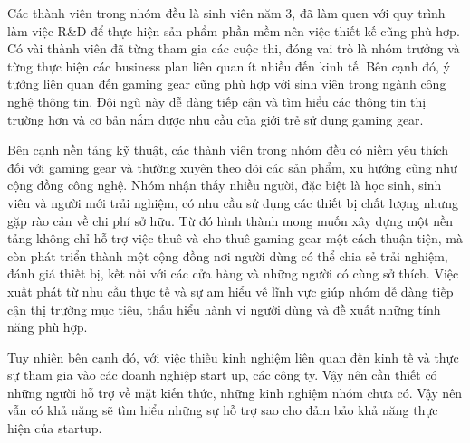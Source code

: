 Các thành viên trong nhóm đều là sinh viên năm 3, đã làm quen với quy trình làm việc R\&D để thực hiện sản phẩm phần mềm nên việc thiết kế cũng phù hợp. Có vài thành viên đã từng tham gia các cuộc thi, đóng vai trò là nhóm trưởng và từng thực hiện các business plan liên quan ít nhiều đến kinh tế. Bên cạnh đó, ý tưởng liên quan đến gaming gear cũng phù hợp với sinh viên trong ngành công nghệ thông tin. Đội ngũ này dễ dàng tiếp cận và tìm hiểu các thông tin thị trường hơn và cơ bản nắm được nhu cầu của giới trẻ sử dụng gaming gear.

Bên cạnh nền tảng kỹ thuật, các thành viên trong nhóm đều có niềm yêu thích đối với gaming gear và thường xuyên theo dõi các sản phẩm, xu hướng cũng như cộng đồng công nghệ. Nhóm nhận thấy nhiều người, đặc biệt là học sinh, sinh viên và người mới trải nghiệm, có nhu cầu sử dụng các thiết bị chất lượng nhưng gặp rào cản về chi phí sở hữu. Từ đó hình thành mong muốn xây dựng một nền tảng không chỉ hỗ trợ việc thuê và cho thuê gaming gear một cách thuận tiện, mà còn phát triển thành một cộng đồng nơi người dùng có thể chia sẻ trải nghiệm, đánh giá thiết bị, kết nối với các cửa hàng và những người có cùng sở thích. Việc xuất phát từ nhu cầu thực tế và sự am hiểu về lĩnh vực giúp nhóm dễ dàng tiếp cận thị trường mục tiêu, thấu hiểu hành vi người dùng và đề xuất những tính năng phù hợp.

Tuy nhiên bên cạnh đó, với việc thiếu kinh nghiệm liên quan đến kinh tế và thực sự tham gia vào các doanh nghiệp start up, các công ty. Vậy nên cần thiết có những người hỗ trợ về mặt kiến thức, những kinh nghiệm nhóm chưa có. Vậy nên vẫn có khả năng sẽ tìm hiểu những sự hỗ trợ sao cho đảm bảo khả năng thực hiện của startup.